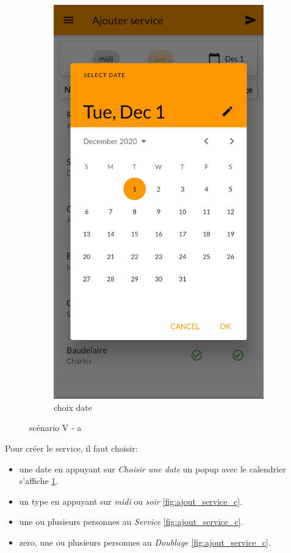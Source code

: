 \begin{figure}[!h]
\begin{subfigure}{.3\textwidth}
            \includegraphics[width=0.9\linewidth]{screenshots/scenario_05/ajout_service_b.png}
            \caption{choix date}
            \label{fig:choix_date}
        \end{subfigure}
        \caption{scénario V - a}
        \label{fig:scen05a}
    \end{figure}

    Pour créer le service, il faut choisir:
    \begin{itemize}
        \item une date en appuyant sur \textit{Choisir une date} un popup avec le calendrier s'affiche \ref{fig:choix_date}.
        \item un type en appuyant sur \textit{midi} ou \textit{soir} \ref{fig:ajout_service_c}. 
        \item une ou plusieurs personnes au \textit{Service} \ref{fig:ajout_service_c}.
        \item zero, une ou plusieurs personnes au \textit{Doublage} \ref{fig:ajout_service_c}.
    \end{itemize}

